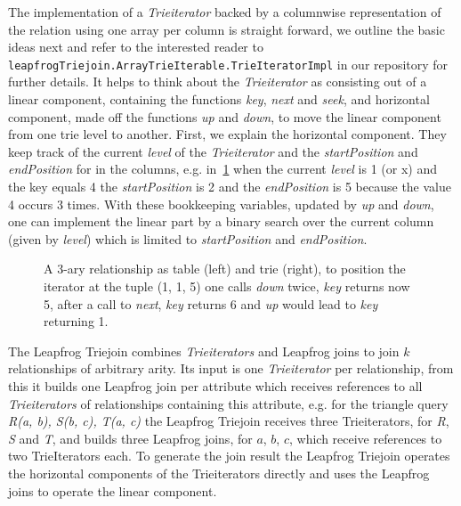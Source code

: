 The implementation of a \textit{Trieiterator} backed by a columnwise representation of the relation using one array
per column is straight forward, we outline the basic ideas next and refer to the interested reader to
\texttt{leapfrogTriejoin.ArrayTrieIterable.TrieIteratorImpl} in our repository for further details.  %
It helps to think about the \textit{Trieiterator} as consisting out of a linear component, containing the functions
\textit{key}, \textit{next} and \textit{seek}, and horizontal component, made off the functions \textit{up} and \textit{down},
to move the linear component from one trie level to another.
First, we explain the horizontal component.
They keep track of the current \textit{level} of the \textit{Trieiterator} and the \textit{startPosition} and \textit{endPosition}
for in the columns,
e.g. in~\cref{fig:trie-example} when the current \textit{level} is 1 (or x) and the key equals 4 the \textit{startPosition} is 2 and
the \textit{endPosition} is 5 because the value 4 occurs 3 times.
With these bookkeeping variables, updated by \textit{up} and \textit{down}, one can implement the linear part by
a binary search over the current column (given by \textit{level}) which is limited to \textit{startPosition} and \textit{endPosition}.

\begin{figure}
    \centering
    
    \caption{A 3-ary relationship as table (left) and trie (right), to position the iterator at the tuple (1, 1, 5) one
    calls \textit{down} twice, \textit{key} returns now 5, after a call to \textit{next}, \textit{key} returns 6 and \textit{up}
    would lead to \textit{key} returning 1.}
    \label{fig:trie-example}
\end{figure}

The Leapfrog Triejoin combines \textit{Trieiterators} and Leapfrog joins to join $k$ relationships of arbitrary arity.
Its input is one \textit{Trieiterator} per relationship, from this it builds one Leapfrog join per attribute which
receives references to all \textit{Trieiterators} of relationships containing this attribute, e.g. for the triangle query
\textit{R(a, b), S(b, c), T(a, c)} the Leapfrog Triejoin receives three Trieiterators, for \textit{R}, \textit{S} and \textit{T},
and builds three Leapfrog joins, for $a$, $b$, $c$, which receive references to two TrieIterators each.
To generate the join result the Leapfrog Triejoin operates the horizontal components of the Trieiterators directly and
uses the Leapfrog joins to operate the linear component.


